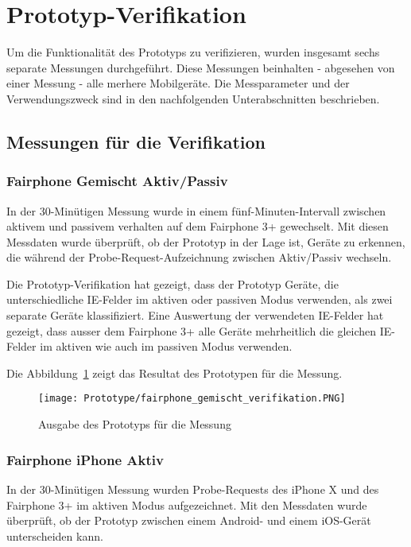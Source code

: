 \section{Prototyp-Verifikation
\label{section:verification}}
Um die Funktionalität des Prototyps zu verifizieren, wurden insgesamt sechs
separate Messungen durchgeführt. Diese Messungen beinhalten - abgesehen von 
einer Messung - alle merhere Mobilgeräte. Die Messparameter und der Verwendungszweck
sind in den nachfolgenden Unterabschnitten beschrieben.

\subsection{Messungen für die Verifikation}
\subsubsection*{Fairphone Gemischt Aktiv/Passiv}
In der 30-Minütigen Messung wurde in einem fünf-Minuten-Intervall zwischen 
aktivem und passivem verhalten auf dem Fairphone 3+ gewechselt.
Mit diesen Messdaten wurde überprüft, ob der Prototyp in der Lage ist, 
Geräte zu erkennen, die während der Probe-Request-Aufzeichnung zwischen Aktiv/Passiv 
wechseln.

Die Prototyp-Verifikation hat gezeigt, dass der Prototyp Geräte, 
die unterschiedliche IE-Felder im aktiven oder passiven Modus verwenden, 
als zwei separate Geräte klassifiziert. Eine Auswertung der verwendeten 
IE-Felder hat gezeigt, dass ausser dem Fairphone 3+ alle Geräte mehrheitlich 
die gleichen IE-Felder im aktiven wie auch im passiven Modus verwenden.

Die Abbildung~\ref{figure:fairphonemixed} zeigt das Resultat des Prototypen 
für die Messung.

\begin{figure}[h!]
	\centering
	\texttt{[image: Prototype/fairphone\_gemischt\_verifikation.PNG]}
    \caption{Ausgabe des Prototyps für die Messung 
	\label{figure:fairphonemixed}}
\end{figure}

\clearpage 


\subsubsection*{Fairphone iPhone Aktiv}
In der 30-Minütigen Messung wurden Probe-Requests des iPhone X und des 
Fairphone 3+ im aktiven Modus aufgezeichnet. 
Mit den Messdaten wurde überprüft, ob der Prototyp zwischen einem 
Android- und einem iOS-Gerät unterscheiden kann.

